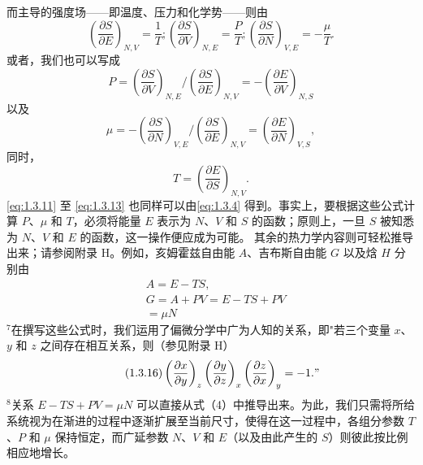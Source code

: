 而主导的强度场——即温度、压力和化学势——则由
\begin{equation}\tag{1.3.11}\label{eq:1.3.11}
\left( \frac { \partial S } { \partial E } \right) _ { N , V } = \frac { 1 } { T } ;  \left( \frac { \partial S } { \partial V } \right) _ { N , E } = \frac { P } { T } ;  \left( \frac { \partial S } { \partial N } \right) _ { V , E } = - \frac { \mu } { T } .
\end{equation}
或者，我们也可以写成
\begin{equation}\tag{1.3.12}\label{eq:1.3.12}
P = \left( \frac { \partial S } { \partial V } \right) _ { N , E } \Bigg / \left( \frac { \partial S } { \partial E } \right) _ { N , V } = - \left( \frac { \partial E } { \partial V } \right) _ { N , S }
\end{equation}
以及
\begin{equation}\tag{1.3.13}\label{eq:1.3.13}
\mu = - \left( \frac { \partial S } { \partial N } \right) _ { V , E } \bigg / \left( \frac { \partial S } { \partial E } \right) _ { N , V } = \left( \frac { \partial E } { \partial N } \right) _ { V , S } ,
\end{equation}
同时，
\begin{equation}\tag{1.3.14}\label{eq:1.3.14}
T = \left( { \frac { \partial E } { \partial S } } \right) _ { N , V } .
\end{equation}
\autoref{eq:1.3.11} 至 \autoref{eq:1.3.13} 也同样可以由\autoref{eq:1.3.4} 得到。事实上，要根据这些公式计算 \(P\)、\(\mu\) 和 \(T\)，必须将能量 \(E\) 表示为 \(N\)、\(V\) 和 \(S\) 的函数；原则上，一旦 \(S\) 被知悉为 \(N\)、\(V\) 和 \(E\) 的函数，这一操作便应成为可能。
其余的热力学内容则可轻松推导出来；请参阅附录 H。例如，亥姆霍兹自由能 \(A\)、吉布斯自由能 \(G\) 以及焓 \(H\) 分别由
\begin{equation}\tag{1.3.15}\label{eq:1.3.15}
\begin{array}{rl} & { A = E - T S , } \\& { G = A + P V = E - T S + P V } \\& { = \mu N } \end{array}
\end{equation}
\(^{7}\)在撰写这些公式时，我们运用了偏微分学中广为人知的关系，即"若三个变量 \(x\)、\(y\) 和 \(z\) 之间存在相互关系，则（参见附录 H）
\begin{equation}\tag{1.3.16}\label{eq:1.3.16}
\left(\frac{\partial x}{\partial y}\right)_z\left(\frac{\partial y}{\partial z}\right)_x\left(\frac{\partial z}{\partial x}\right)_y=-1."
\end{equation}
\(^{8}\)关系 \(E-TS+PV=\mu N\) 可以直接从式（4）中推导出来。为此，我们只需将所给系统视为在渐进的过程中逐渐扩展至当前尺寸，使得在这一过程中，各组分参数 \(T\)、\(P\) 和 \(\mu\) 保持恒定，而广延参数 \(N\)、\(V\) 和 \(E\)（以及由此产生的 \(S\)）则彼此按比例相应地增长。
